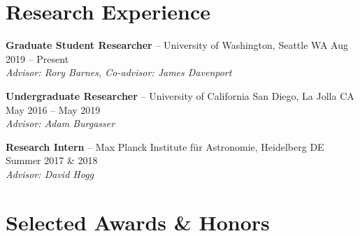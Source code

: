 \documentclass[a4,11pt]{article}
\begin{document}
\section{Research Experience} 

\textbf{Graduate Student Researcher} -- University of Washington, Seattle WA \hfill Aug 2019 -- Present \\
\textsl{Advisor: Rory Barnes, Co-advisor: James Davenport} \\
\vspace{.2cm} 

\vspace{.2cm} 

\textbf{Undergraduate Researcher} -- University of California San Diego, La Jolla CA \hfill May 2016 -- May 2019  \\
\textsl{Advisor: Adam Burgasser} \\
\vspace{.2cm} 

\textbf{Research Intern} -- Max Planck Institute f{\"u}r Astronomie, Heidelberg DE \hfill Summer 2017 \& 2018 \\
\textsl{Advisor: David Hogg} \\


\section{Selected Awards \& Honors}
\end{document}

